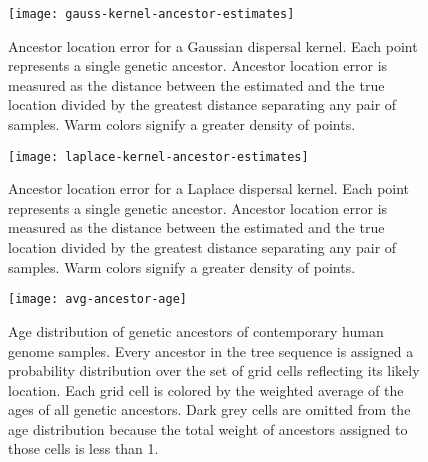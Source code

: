 \begin{figure}[h]
\centering
\texttt{[image: gauss-kernel-ancestor-estimates]}
\caption{Ancestor location error for a Gaussian dispersal kernel. Each point
represents a single genetic ancestor. Ancestor location error is measured as
the distance between the estimated and the true location divided by the greatest
distance separating any pair of samples. Warm colors signify a greater density
of points.
}
\label{fig:gauss-kernel-ancestor-estimates}
\end{figure}

\begin{figure}[h]
\centering
\texttt{[image: laplace-kernel-ancestor-estimates]}
\caption{Ancestor location error for a Laplace dispersal kernel. Each point
represents a single genetic ancestor. Ancestor location error is measured as
the distance between the estimated and the true location divided by the greatest
distance separating any pair of samples. Warm colors signify a greater density
of points.
}
\label{fig:lapl-kernel-ancestor-estimates}
\end{figure}

\begin{figure}[h]
\centering
\texttt{[image: avg-ancestor-age]}
\caption{Age distribution of genetic ancestors of contemporary human genome
samples. Every ancestor in the tree sequence is assigned a probability distribution 
over the set of grid cells reflecting its likely location. Each grid cell is 
colored by the weighted average of the ages of all genetic ancestors. Dark grey 
cells are omitted from the age distribution because the total weight of ancestors 
assigned to those cells is less than 1.}
\label{fig:avg-ancestor-age}
\end{figure}